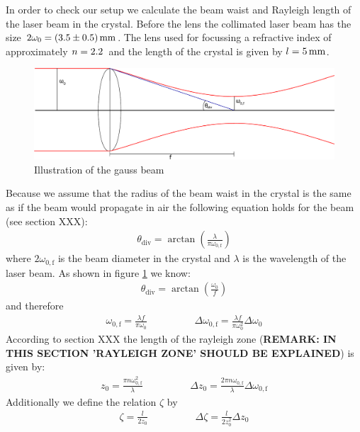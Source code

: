 \documentclass{protokoll_en}
\begin{document}
In order to check our setup we calculate the beam waist and Rayleigh length of the laser beam in the crystal. Before the lens the collimated laser beam has the size $2\omega_0 = \unit[(3.5 \pm 0.5)]{mm}$. The lens used for focussing a refractive index of approximately $n = \unit[2.2]{}$ and the length of the crystal is given by $l=\unit[5]{mm}$.
\begin{figure}[H]
  \centering
  \includegraphics[width=1.0\textwidth]{graphics/ana_gauss}
  \caption{Illustration of the gauss beam}
  \label{fig:ana_gauss}
\end{figure}
Because we assume that the radius of the beam waist in the crystal is the same as if the beam would propagate in air the following equation holds for the beam (see section XXX):
\begin{align*}
\theta_\textrm{div} = \arctan\left(\frac{\lambda}{\pi\omega_{0,\textrm{f}}}\right)
\end{align*}
where $2\omega_{0,\textrm{f}}$ is the beam diameter in the crystal and $\lambda$ is the wavelength of the laser beam. As shown in figure \ref{fig:ana_gauss} we know:
\begin{align*}
\theta_\textrm{div} = \arctan\left(\frac{\omega_0}{f}\right)
\end{align*}
and therefore
\begin{align}
\omega_{0,\textrm{f}} = \frac{\lambda f}{\pi\omega_0} \hspace{2cm} \Delta \omega_{0,\textrm{f}} = \frac{\lambda f}{\pi\omega_0^2}\Delta \omega_0
\end{align}
According to section XXX the length of the rayleigh zone (\textbf{REMARK: IN THIS SECTION 'RAYLEIGH ZONE' SHOULD BE EXPLAINED}) is given by:
\begin{align}
z_0 = \frac{\pi n\omega_{0,\textrm{f}}^2}{\lambda} \hspace{2cm} \Delta z_0 = \frac{2\pi n\omega_{0,\textrm{f}}}{\lambda}\Delta \omega_{0,\textrm{f}}
\end{align}
Additionally we define the relation $\zeta$ by
\begin{align}
\zeta = \frac{l}{2z_0} \hspace{2cm} \Delta \zeta = \frac{l}{2z_0^2}\Delta z_0
\end{align}
\end{document}
